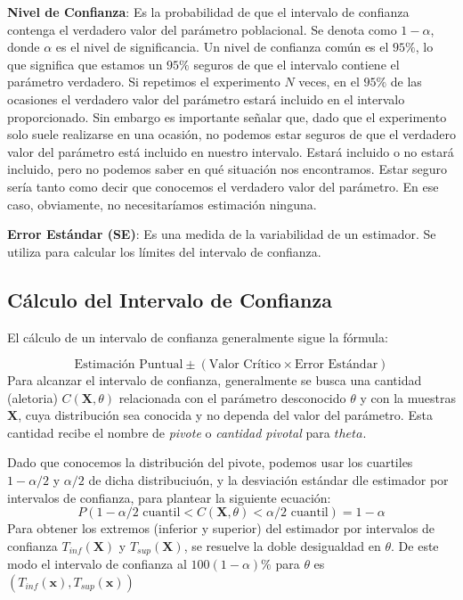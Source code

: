 \documentclass[
  letterpaper,
  DIV=11,
  numbers=noendperiod]{scrreprt}
\begin{document}
\textbf{Nivel de Confianza}: Es la probabilidad de que el intervalo de
confianza contenga el verdadero valor del parámetro poblacional. Se
denota como \(1 - \alpha\), donde \(\alpha\) es el nivel de
significancia. Un nivel de confianza común es el \(95\%\), lo que
significa que estamos un \(95\%\) seguros de que el intervalo contiene
el parámetro verdadero. Si repetimos el experimento \(N\) veces, en el
\(95\%\) de las ocasiones el verdadero valor del parámetro estará
incluido en el intervalo proporcionado. Sin embargo es importante
señalar que, dado que el experimento solo suele realizarse en una
ocasión, no podemos estar seguros de que el verdadero valor del
parámetro está incluido en nuestro intervalo. Estará incluido o no
estará incluido, pero no podemos saber en qué situación nos encontramos.
Estar seguro sería tanto como decir que conocemos el verdadero valor del
parámetro. En ese caso, obviamente, no necesitaríamos estimación
ninguna.

\textbf{Error Estándar (SE)}: Es una medida de la variabilidad de un
estimador. Se utiliza para calcular los límites del intervalo de
confianza.

\hypertarget{cuxe1lculo-del-intervalo-de-confianza}{%
\subsection{Cálculo del Intervalo de
Confianza}\label{cuxe1lculo-del-intervalo-de-confianza}}

El cálculo de un intervalo de confianza generalmente sigue la fórmula:

\[
\text{Estimación Puntual} \pm (\text{Valor Crítico} \times \text{Error Estándar})
\] Para alcanzar el intervalo de confianza, generalmente se busca una
cantidad (aletoria) \(C(\mathbf{X},\theta)\) relacionada con el
parámetro desconocido \(\theta\) y con la muestras \(\mathbf{X}\), cuya
distribución sea conocida y no dependa del valor del parámetro. Esta
cantidad recibe el nombre de \emph{pivote} o \emph{cantidad pivotal}
para \(theta\).

Dado que conocemos la distribución del pivote, podemos usar los
cuartiles \(1-\alpha/2\) y \(\alpha/2\) de dicha distribuciuón, y la
desviación estándar dle estimador por intervalos de confianza, para
plantear la siguiente ecuación: \[
P(1-\alpha/2 \text{ cuantil}< C(\mathbf{X},\theta)<\alpha/2 \text{ cuantil}) = 1- \alpha
\] Para obtener los extremos (inferior y superior) del estimador por
intervalos de confianza \(T_{inf}(\mathbf{X})\) y
\(T_{sup}(\mathbf{X})\), se resuelve la doble desigualdad en \(\theta\).
De este modo el intervalo de confianza al \(100(1-\alpha)\%\) para
\(\theta\) es \((T_{inf}(\mathbf{x}),T_{sup}(\mathbf{x}))\)
\end{document}
